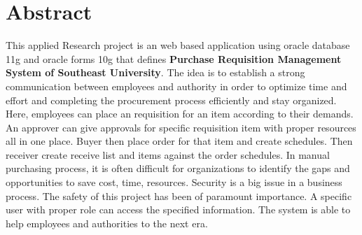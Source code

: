 \documentclass[12pt]{report} %
\begin{document}











\chapter*{Abstract}   %

This applied Research project is an web based application using oracle database 11g and oracle forms 10g that defines \textbf{Purchase Requisition Management System of Southeast University}. The idea is to establish a strong communication between employees and authority in order to optimize time and effort and completing the procurement process efficiently and stay organized. Here, employees can place an requisition for an item according to their demands. An approver can give approvals for specific requisition item with proper resources all in one place. Buyer then place order for that item and create schedules. Then receiver create receive list and items against the order schedules. In manual purchasing process, it is often difficult for organizations to identify the gaps and opportunities to save cost, time, resources. Security is a big issue in a business process. The safety of this project has been of paramount importance. A specific user with proper role can access the specified information. The system is able to help employees and authorities to the next era.
\end{document}
